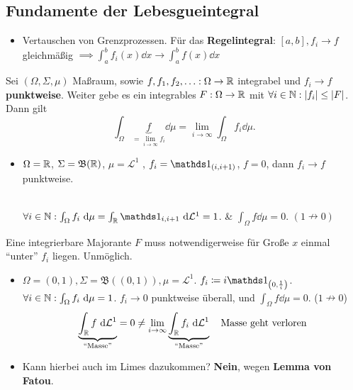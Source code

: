 \subsection{Fundamente der Lebesgueintegral}
\begin{itemize}
	\item Vertauschen von Grenzprozessen.
		Für das \textbf{Regelintegral}: $ [a, b], f_i \to f $ gleichmäßig $ \implies \int_{a}^{b} f_i(x) \dd x \to \int_{a}^{b} f(x) \dd x $
\end{itemize}
\begin{theorem*}
	Sei $ (\Omega, \Sigma, \mu) $ Maßraum, sowie $ f, f_1, f_2, \dotsc : \Omega \to \mathbb{R}  $ integrabel und $ f_i \to f $ \textbf{punktweise}.
	Weiter gebe es ein integrables $ F: \Omega \to \mathbb{R}  $ mit $ \forall i \in \mathbb{N} : \left| f_i \right| \leq \left| F \right|  $.
	Dann gilt
	\[
		\int_\Omega \underbrace{f}_{= \lim_{i \to \infty} f_i} \dd \mu = \lim_{i \to \infty} \int _\Omega f_i \dd \mu.
	\]
	\begin{itemize}
		\item $ \Omega = \mathbb{R}  $, $ \Sigma = \mathfrak{B} (\mathbb{R} ) $, $ \mu = \mathcal{L} ^1 $ , $ f_i = \I_{(i, i + 1)}  $, $ f = 0 $, dann $ f_i \to f $ punktweise.\\
			\\
			$ \forall i \in \N : \int _\Omega f_i \dd \mu = \int _{\R } \I_{i, i + 1} \dd \mathcal{L} ^1 = 1  $. \& $ \int _\Omega f \dd \mu = 0 $. $ (1 \nrightarrow 0) $
	\end{itemize}
	Eine integrierbare Majorante $ F $ muss notwendigerweise für Große $ x $ einmal ``unter'' $ f_i $ liegen. Unmöglich.
\end{theorem*}

\begin{itemize}
	\item $ \Omega = (0, 1), \Sigma = \mathfrak{B}((0, 1)), \mu = \mathcal{L}^1  $. $ f_i \coloneqq i \I_{\left(0, \frac{ 1 }{ i } \right)}  $.
		$ \forall i \in \mathbb{N} : \int _\Omega f_i ~\text{d} \mu = 1 $.
		$ f_i \to 0 $ punktweise überall, und $ \int _\Omega f \dd \mu = 0 $. ($ 1 \nrightarrow 0 $)
		\[
			\underbrace{\int _{\mathbb{R} } f ~\text{d} \mathcal{L} ^1}_{\text{``Masse''}}  = 0 \neq \lim_{i \to \infty} \underbrace{\int _{\mathbb{R} } f_i ~\text{d} \mathcal{L} ^1}_{\text{``Masse''} } \quad \text{Masse geht verloren} 
		\]
	\item Kann hierbei auch im Limes dazukommen? \textbf{Nein}, wegen \textbf{Lemma von Fatou}.
\end{itemize}
	
